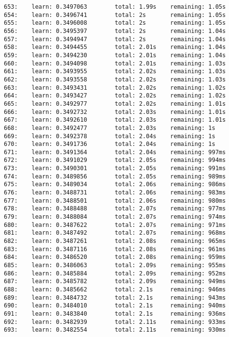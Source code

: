 \documentclass[11pt]{article}
\begin{document}
\begin{Verbatim}[commandchars=\\\{\}]
653:    learn: 0.3497063        total: 1.99s    remaining: 1.05s
654:    learn: 0.3496741        total: 2s       remaining: 1.05s
655:    learn: 0.3496008        total: 2s       remaining: 1.05s
656:    learn: 0.3495397        total: 2s       remaining: 1.04s
657:    learn: 0.3494947        total: 2s       remaining: 1.04s
658:    learn: 0.3494455        total: 2.01s    remaining: 1.04s
659:    learn: 0.3494230        total: 2.01s    remaining: 1.04s
660:    learn: 0.3494098        total: 2.01s    remaining: 1.03s
661:    learn: 0.3493955        total: 2.02s    remaining: 1.03s
662:    learn: 0.3493558        total: 2.02s    remaining: 1.03s
663:    learn: 0.3493431        total: 2.02s    remaining: 1.02s
664:    learn: 0.3493427        total: 2.02s    remaining: 1.02s
665:    learn: 0.3492977        total: 2.02s    remaining: 1.01s
666:    learn: 0.3492732        total: 2.03s    remaining: 1.01s
667:    learn: 0.3492610        total: 2.03s    remaining: 1.01s
668:    learn: 0.3492477        total: 2.03s    remaining: 1s
669:    learn: 0.3492378        total: 2.04s    remaining: 1s
670:    learn: 0.3491736        total: 2.04s    remaining: 1s
671:    learn: 0.3491364        total: 2.04s    remaining: 997ms
672:    learn: 0.3491029        total: 2.05s    remaining: 994ms
673:    learn: 0.3490301        total: 2.05s    remaining: 991ms
674:    learn: 0.3489856        total: 2.05s    remaining: 989ms
675:    learn: 0.3489034        total: 2.06s    remaining: 986ms
676:    learn: 0.3488731        total: 2.06s    remaining: 983ms
677:    learn: 0.3488501        total: 2.06s    remaining: 980ms
678:    learn: 0.3488488        total: 2.07s    remaining: 977ms
679:    learn: 0.3488084        total: 2.07s    remaining: 974ms
680:    learn: 0.3487622        total: 2.07s    remaining: 971ms
681:    learn: 0.3487492        total: 2.07s    remaining: 968ms
682:    learn: 0.3487261        total: 2.08s    remaining: 965ms
683:    learn: 0.3487116        total: 2.08s    remaining: 961ms
684:    learn: 0.3486520        total: 2.08s    remaining: 959ms
685:    learn: 0.3486063        total: 2.09s    remaining: 955ms
686:    learn: 0.3485884        total: 2.09s    remaining: 952ms
687:    learn: 0.3485782        total: 2.09s    remaining: 949ms
688:    learn: 0.3485662        total: 2.1s     remaining: 946ms
689:    learn: 0.3484732        total: 2.1s     remaining: 943ms
690:    learn: 0.3484010        total: 2.1s     remaining: 940ms
691:    learn: 0.3483840        total: 2.1s     remaining: 936ms
692:    learn: 0.3482939        total: 2.11s    remaining: 933ms
693:    learn: 0.3482554        total: 2.11s    remaining: 930ms

\end{Verbatim}
\end{document}
